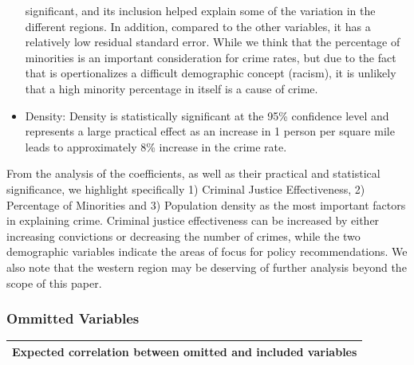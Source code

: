 \documentclass[]{article}
\begin{document}
\begin{itemize}
  significant, and its inclusion helped explain some of the variation in
  the different regions. In addition, compared to the other variables,
  it has a relatively low residual standard error. While we think that
  the percentage of minorities is an important consideration for crime
  rates, but due to the fact that is opertionalizes a difficult
  demographic concept (racism), it is unlikely that a high minority
  percentage in itself is a cause of crime.\\
\item
  Density: Density is statistically significant at the 95\% confidence
  level and represents a large practical effect as an increase in 1
  person per square mile leads to approximately 8\% increase in the
  crime rate.
\end{itemize}

From the analysis of the coefficients, as well as their practical and
statistical significance, we highlight specifically 1) Criminal Justice
Effectiveness, 2) Percentage of Minorities and 3) Population density as
the most important factors in explaining crime. Criminal justice
effectiveness can be increased by either increasing convictions or
decreasing the number of crimes, while the two demographic variables
indicate the areas of focus for policy recommendations. We also note
that the western region may be deserving of further analysis beyond the
scope of this paper.

\hypertarget{ommitted-variables}{%
\subsubsection{Ommitted Variables}\label{ommitted-variables}}

\begin{longtable}[]{@{}l@{}}
\toprule
Expected correlation between omitted and included
variables\tabularnewline
\midrule
\endhead
\bottomrule
\end{longtable}
\end{document}
